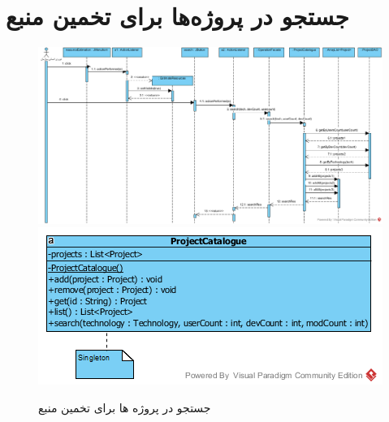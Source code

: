 \section{جستجو در پروژه‌ها برای تخمین منبع}
\begin{figure}[H]
	\centering
	\includegraphics[scale=0.7]{img/sequence-design/SearchInProjects}
	\includegraphics[scale=0.7]{img/sequence-design/SearchInProjectsC}
	\caption{جستجو در پروژه ها برای تخمین منبع}
\end{figure}

